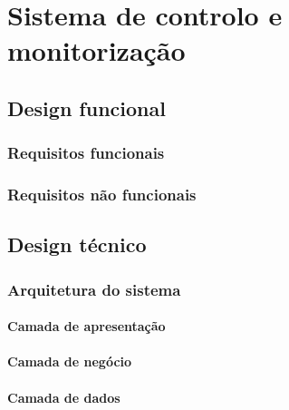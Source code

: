 


\chapter{Sistema de controlo e monitorização}

\section{Design funcional}









\subsection{Requisitos funcionais}

\subsection{Requisitos não funcionais}







\section{Design técnico}



\subsection{Arquitetura do sistema}



\subsubsection{Camada de apresentação}


\subsubsection{Camada de negócio}



\subsubsection{Camada de dados}




